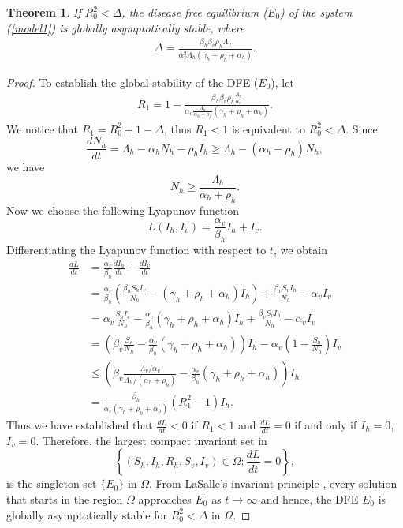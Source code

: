 \documentclass[review]{elsarticle}
\newtheorem{theorem}{Theorem}
\begin{document}
\begin{theorem}
If $R_0^2<\Delta$, the disease free equilibrium ($E_0$) of the system (\ref{model1}) is \textit{globally asymptotically stable}, where
\begin{align*}
\Delta = \frac{\beta_h\beta_v\rho_h\Lambda_v}{\alpha_v^2\Lambda_h(\gamma_h+\rho_h+\alpha_h)}.
\end{align*}
\end{theorem}
\begin{proof}
To establish the global stability of the DFE ($E_0$), let
\begin{align*}
R_1 = 1-\frac{\beta_h\beta_v\rho_h\frac{\Lambda_v}{\alpha_v}}{\alpha_v\frac{\Lambda_h}{\alpha_h+\rho_h}(\gamma_h+\rho_h+\alpha_h)}.
\end{align*}
We notice that $R_1=R_0^2+1-\Delta$, thus $R_1<1$ is equivalent to $R_0^2<\Delta$. Since
\[
\frac{dN_h}{dt}=\Lambda_h-\alpha_h N_h-\rho_hI_h\geq \Lambda_h-(\alpha_h+\rho_h) N_h,
\]
we have
\[N_h\geq \frac{\Lambda_h}{\alpha_h+\rho_h}.\]
Now we choose the following Lyapunov function
\[
L(I_h,I_v)=\frac{\alpha_v}{\beta_h}I_h+I_v.
\]
Differentiating the Lyapunov function with respect to $t$, we obtain
\begin{align*}
\frac{dL}{dt} &= \frac{\alpha_v}{\beta_h}\frac{dI_h}{dt}+\frac{dI_v}{dt}\\
    &=\frac{\alpha_v}{\beta_h}\left(\frac{\beta_h S_hI_v}{N_h}-(\gamma_h+\rho_h+\alpha_h)I_h\right)+\frac{\beta_v S_vI_h}{N_h}-\alpha_v I_v\\
   &=\alpha_v\frac{S_hI_v}{N_h}-\frac{\alpha_v}{\beta_h}(\gamma_h+\rho_h+\alpha_h)I_h+\frac{\beta_v S_vI_h}{N_h}-\alpha_v I_v\\
   &=\left(\beta_v\frac{S_v}{N_h}-\frac{\alpha_v}{\beta_h}(\gamma_h+\rho_h+\alpha_h)\right)I_h-\alpha_v\left(1-\frac{S_h}{N_h}
   \right)I_v\\
   &\leq \left(\beta_v\frac{\Lambda_v/\alpha_v}{\Lambda_h/(\alpha_h+\rho_h)}-\frac{\alpha_v}{\beta_h}(\gamma_h+\rho_h+\alpha_h)\right)I_h\\
   &= \frac{\beta_h}{\alpha_v(\gamma_h+\rho_h+\alpha_h)}\left(R_1^2-1\right)I_h.
\end{align*}
Thus we have established that $\frac{dL}{dt}<0$ if $R_1<1$ and $\frac{dL}{dt}=0$ if and only if $I_h=0$, $I_v=0$. Therefore, the largest compact invariant set in
\[\left\{(S_h,I_h,R_h,S_v,I_v)\in \Omega:\frac{dL}{dt}=0\right\},\]
is the singleton set $\{E_0\}$ in $\Omega$. From LaSalle's invariant principle \cite{Khalil}, every solution that starts in the region $\Omega$ approaches $E_0$ as $t\to \infty$ and hence, the DFE $E_0$ is globally asymptotically stable for $R_0^2<\Delta$ in $\Omega$.
\end{proof}
\end{document}
